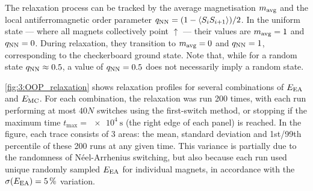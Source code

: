 The relaxation process can be tracked by the average magnetisation $m_\mathrm{avg}$ and the local antiferromagnetic order parameter $q_\mathrm{NN} = (1 - \langle S_i S_{i+1} \rangle)/2$.
In the uniform state --- where all magnets collectively point $\uparrow$ --- their values are $m_\mathrm{avg}=1$ and $q_\mathrm{NN}=0$.
During relaxation, they transition to $m_\mathrm{avg}=0$ and $q_\mathrm{NN}=1$, corresponding to the checkerboard ground state.
Note that, while for a random state $q_\mathrm{NN} \approx 0.5$, a value of $q_\mathrm{NN}=0.5$ does not necessarily imply a random state. \par
\cref{fig:3:OOP_relaxation} shows relaxation profiles for several combinations of $E_\mathrm{EA}$ and $E_\mathrm{MC}$.
For each combination, the relaxation was run 200 times, with each run performing at most $40N$ switches using the first-switch method, or stopping if the maximum time $t_\mathrm{max}=\SI{e4}{\second}$ (the right edge of each panel) is reached.
In the figure, each trace consists of 3 areas: the mean, standard deviation and 1st/99th percentile of these 200 runs at any given time. 
This variance is partially due to the randomness of N\'eel-Arrhenius switching, but also because each run used unique randomly sampled $E_\mathrm{EA}$ for individual magnets, in accordance with the $\sigma(E_\mathrm{EA}) = \SI{5}{\percent}$ variation.


